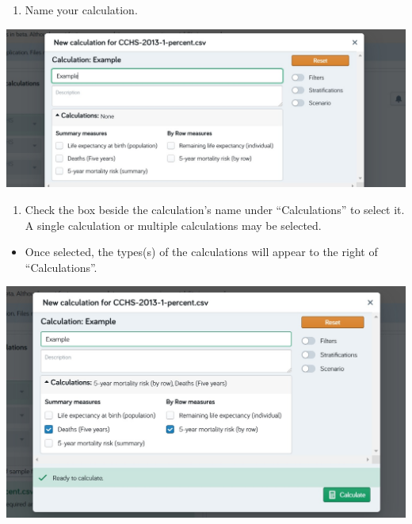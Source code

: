 \documentclass[]{book}
\providecommand{\tightlist}{%
  \setlength{\itemsep}{0pt}\setlength{\parskip}{0pt}}
\begin{document}
\begin{enumerate}
\def\labelenumi{\arabic{enumi}.}
\setcounter{enumi}{1}
\tightlist
\item
  Name your calculation.
\end{enumerate}

\begin{center}\includegraphics{Images/CalcName} \end{center}

\begin{enumerate}
\def\labelenumi{\arabic{enumi}.}
\setcounter{enumi}{2}
\tightlist
\item
  Check the box beside the calculation's name under ``Calculations'' to
  select it. A single calculation or multiple calculations may be
  selected.
\end{enumerate}

\begin{itemize}
\tightlist
\item
  Once selected, the types(s) of the calculations will appear to the
  right of ``Calculations''.
\end{itemize}

\begin{center}\includegraphics{Images/SelectCalc} \end{center}
\end{document}
